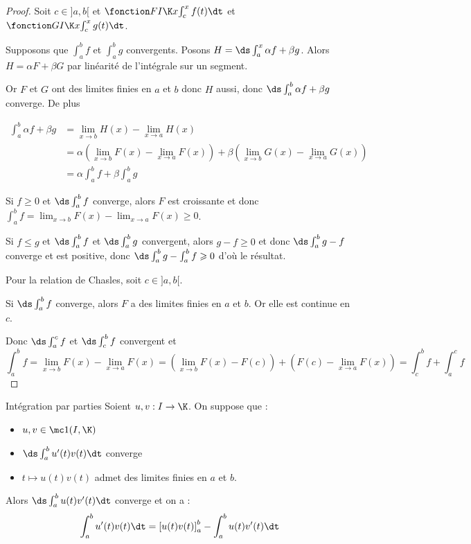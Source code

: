 \begin{proof}
    Soit $c \in ]a, b[$ et $\fonction F I \K x {\int_c^x f (t) \dt}$ et $\fonction G I \K x {\int_c^x g(t) \dt}$.

    Supposons que $\int_{a }^{b } f$ et $\int_{a }^{b } g$ convergents. Posons 
    $H = \ds \int_{a }^{x } \alpha f + \beta g$. Alors $H = \alpha F + \beta G$ par 
    linéarité de l'intégrale sur un segment. 

    Or $F$ et $G$ ont des limites finies en $a$ et $b$ donc $H$ aussi, donc
    $\ds \int_{a }^{b } \alpha f + \beta g$ converge.
    De plus 

    \begin{align}
        \int_{a }^{b } \alpha f + \beta g &= \lim_{x \to b} H(x) - \lim_{x \to a} H(x) \\
        &= \alpha \left( \lim_{x \to b} F(x) - \lim_{x \to a} F(x) \right) + \beta \left( \lim_{x \to b} G(x) - \lim_{x \to a} G(x) \right) \\
        &= \alpha \int_{a }^{b } f + \beta \int_{a }^{b } g
    \end{align}

    \lvspace Si $f \geqslant 0$ et $\ds \int_{a }^{b } f$ converge, alors 
    $F$ est croissante et donc $\int_{a}^b f = \lim_{x \to b} F(x) - \lim_{x \to a} F(x) \geqslant 0$.

    \lvspace Si $f \leqslant g$ et $\ds \int_{a }^{b } f$ et $\ds \int_{a }^{b } g$ convergent, alors 
    $g - f \geqslant 0$ et donc $\ds \int_{a }^{b } g - f$ converge et est positive, donc
    $\ds \int_{a }^{b } g - \int_{a }^{b } f \geqslant 0$ d'où le résultat.

    \lvspace Pour la relation de Chasles, soit $c \in ]a, b[$.

    Si $\ds \int_{a }^{b } f$ converge, alors $F$ a des limites finies en $a$ et $b$. Or elle 
    est continue en $c$. 

    Donc $\ds \int_{a }^{c }f$ et $\ds \int_{c }^{b } f$ convergent et
    $$ \int_{a }^{b } f = \lim_{x \to b} F(x) - \lim_{x \to a} F(x) = \left( \lim_{x \to b} F(x) - F(c) \right) + \left( F(c) - \lim_{x \to a} F(x) \right) = \int_{c }^{b } f + \int_{a }^{c } f $$
\end{proof}

\begin{theoreme}{Intégration par parties}{}
    Soient $u, v : I \to \K $. On suppose que :
    \begin{itemize}
        \item $u, v \in  \mc 1 (I, \K)$
        \item $\ds \int_{a }^{b } u'(t) v(t) \dt$ converge
        \item $t \mapsto u(t) v(t)$ admet des limites finies en $a$ et $b$.
    \end{itemize} 

    Alors $\ds \int_a^b u(t) v'(t) \dt$ converge et on a :
    $$ \int_a^b u'(t) v(t) \dt = \left[ u(t) v(t) \right]_a^b - \int_a^b u(t) v'(t) \dt $$
\end{theoreme}


